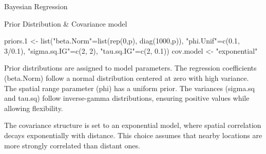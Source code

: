 \documentclass[
  ignorenonframetext,
]{beamer}
\newenvironment{Shaded}{\begin{snugshade}}{\end{snugshade}}
\newcommand{\DecValTok}[1]{\textcolor[rgb]{0.68,0.00,0.00}{#1}}
\newcommand{\FloatTok}[1]{\textcolor[rgb]{0.68,0.00,0.00}{#1}}
\newcommand{\FunctionTok}[1]{\textcolor[rgb]{0.28,0.35,0.67}{#1}}
\newcommand{\NormalTok}[1]{\textcolor[rgb]{0.00,0.23,0.31}{#1}}
\newcommand{\OtherTok}[1]{\textcolor[rgb]{0.00,0.23,0.31}{#1}}
\newcommand{\SpecialCharTok}[1]{\textcolor[rgb]{0.37,0.37,0.37}{#1}}
\newcommand{\StringTok}[1]{\textcolor[rgb]{0.13,0.47,0.30}{#1}}
\begin{document}
\begin{frame}[fragile]{Bayesian Regression}
\label{bayesian-regression-2}
\begin{block}{Prior Distribution \& Covariance model}
\label{prior-distribution-covariance-model}
\begin{Shaded}
\begin{Highlighting}[]
\NormalTok{priors}\FloatTok{.1} \OtherTok{\textless{}{-}} \FunctionTok{list}\NormalTok{(}\StringTok{"beta.Norm"}\OtherTok{=}\FunctionTok{list}\NormalTok{(}\FunctionTok{rep}\NormalTok{(}\DecValTok{0}\NormalTok{,p), }\FunctionTok{diag}\NormalTok{(}\DecValTok{1000}\NormalTok{,p)),}
                 \StringTok{"phi.Unif"}\OtherTok{=}\FunctionTok{c}\NormalTok{(}\FloatTok{0.1}\NormalTok{, }\DecValTok{3}\SpecialCharTok{/}\FloatTok{0.1}\NormalTok{), }
                 \StringTok{"sigma.sq.IG"}\OtherTok{=}\FunctionTok{c}\NormalTok{(}\DecValTok{2}\NormalTok{, }\DecValTok{2}\NormalTok{),}
                 \StringTok{"tau.sq.IG"}\OtherTok{=}\FunctionTok{c}\NormalTok{(}\DecValTok{2}\NormalTok{, }\FloatTok{0.1}\NormalTok{))}
\NormalTok{cov.model }\OtherTok{\textless{}{-}} \StringTok{"exponential"}                 
\end{Highlighting}
\end{Shaded}

Prior distributions are assigned to model parameters. The regression
coefficients (beta.Norm) follow a normal distribution centered at zero
with high variance. The spatial range parameter (phi) has a uniform
prior. The variances (sigma.sq and tau.sq) follow inverse-gamma
distributions, ensuring positive values while allowing flexibility.

The covariance structure is set to an exponential model, where spatial
correlation decays exponentially with distance. This choice assumes that
nearby locations are more strongly correlated than distant ones.
\end{block}
\end{frame}
\end{document}
